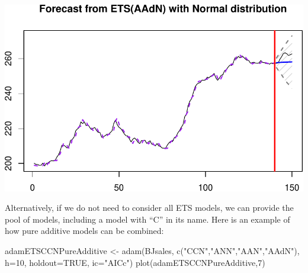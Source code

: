 \documentclass[
]{book}
\newenvironment{Shaded}{\begin{snugshade}}{\end{snugshade}}
\newcommand{\AttributeTok}[1]{\textcolor[rgb]{0.77,0.63,0.00}{#1}}
\newcommand{\ConstantTok}[1]{\textcolor[rgb]{0.00,0.00,0.00}{#1}}
\newcommand{\DecValTok}[1]{\textcolor[rgb]{0.00,0.00,0.81}{#1}}
\newcommand{\FunctionTok}[1]{\textcolor[rgb]{0.00,0.00,0.00}{#1}}
\newcommand{\NormalTok}[1]{#1}
\newcommand{\OtherTok}[1]{\textcolor[rgb]{0.56,0.35,0.01}{#1}}
\newcommand{\SpecialCharTok}[1]{\textcolor[rgb]{0.00,0.00,0.00}{#1}}
\newcommand{\StringTok}[1]{\textcolor[rgb]{0.31,0.60,0.02}{#1}}
\theoremstyle{definition}
\theoremstyle{definition}
\theoremstyle{definition}
\theoremstyle{definition}
\theoremstyle{remark}
\begin{document}
\begin{Shaded}
\end{Shaded}

\includegraphics{adam_files/figure-latex/unnamed-chunk-177-1.pdf}

Alternatively, if we do not need to consider all ETS models, we can provide the pool of models, including a model with ``C'' in its name. Here is an example of how pure additive models can be combined:

\begin{Shaded}
\begin{Highlighting}[]
\NormalTok{adamETSCCNPureAdditive }\OtherTok{\textless{}{-}} \FunctionTok{adam}\NormalTok{(BJsales, }
                               \FunctionTok{c}\NormalTok{(}\StringTok{"CCN"}\NormalTok{,}\StringTok{"ANN"}\NormalTok{,}\StringTok{"AAN"}\NormalTok{,}\StringTok{"AAdN"}\NormalTok{), }
                               \AttributeTok{h=}\DecValTok{10}\NormalTok{, }\AttributeTok{holdout=}\ConstantTok{TRUE}\NormalTok{,}
                               \AttributeTok{ic=}\StringTok{"AICc"}\NormalTok{)}
\FunctionTok{plot}\NormalTok{(adamETSCCNPureAdditive,}\DecValTok{7}\NormalTok{)}
\end{Highlighting}
\end{Shaded}
\end{document}
